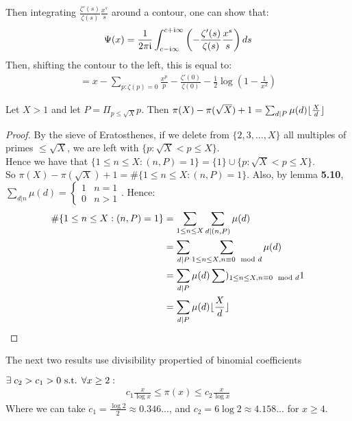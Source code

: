 \documentclass[10pt,a4paper]{article}
\begin{document}
Then integrating $\frac{\zeta'(s)}{\zeta(s)}\frac{x^s}{s}$ around a contour, one can show that:
\begin{align*}
\Psi(x) = \frac{1}{2\pi\mathfrak{i}}\int_{c-\mathfrak{i} \infty}^{c+\mathfrak{i}\infty} \left(-\frac{\zeta'(s)}{\zeta(s)}\frac{x^s}{s}\right) ds
\end{align*}
Then, shifting the contour to the left, this is equal to:
\begin{align*}
= x - \sum_{p:\zeta(p) = 0} \frac{x^p}{p}-\frac{\zeta'(0)}{\zeta(0)} - \frac{1}{2}\log\left(1-\frac{1}{x^2}\right)
\end{align*}

\begin{theorem}
Let $X>1$ and let $P = \Pi_{p\leq \sqrt{X}}p$. Then $\pi(X)-\pi(\sqrt{X})+1 = \sum_{d|P}\mu(d)\lfloor \frac{X}{d} \rfloor$
\end{theorem}
\begin{proof}
By the sieve of Eratosthenes, if we delete from $\{2,3,\ldots, X\}$ all multiples of primes $\leq \sqrt{X}$, we are left with $\{p : \sqrt{X} < p \leq X\}$. \\
Hence we have that $\{1\leq n\leq X:(n,P) = 1\} = \{1\}\cup\{p:\sqrt{X}<p\leq X\}$.\\
So $\pi(X)-\pi(\sqrt{X}) + 1 = \#\{1\leq n\leq X: (n,P) = 1\}$.
Also, by lemma \textbf{5.10}, $\sum_{d|n} \mu(d) = \begin{cases} 1 & n=1 \\ 0 & n>1\end{cases}$. Hence:
\begin{align*}
\#\{1\leq n \leq X: (n,P) = 1\} &= \sum_{1\leq n\leq X} \sum_{d|(n,P)} \mu(d) \\
&= \sum_{d|P} \sum_{1\leq n\leq X, n \equiv 0 \mod d} \mu(d)\\
&= \sum_{d|P} \mu(d) \sum)_{1\leq n \leq X, n\equiv 0 \mod d} 1\\
&= \sum_{d|P} \mu(d) \lfloor \frac{X}{d} \rfloor
\end{align*}
\end{proof}
The next two results use divisibility propertied of binomial coefficients
\begin{theorem}[Tchebychev]
$\exists c_2 > c_1 > 0 \st \forall x \geq 2:$
\begin{align*}
c_1 \frac{x}{\log x} \leq \pi(x) \leq c_2 \frac{x}{\log x}
\end{align*}
Where we can take $c_1 = \frac{\log 2}{2} \approx 0.346\ldots$, and $c_2 = 6\log 2 \approx 4.158\ldots$ for $x \geq 4$.
\end{theorem}
\end{document}
